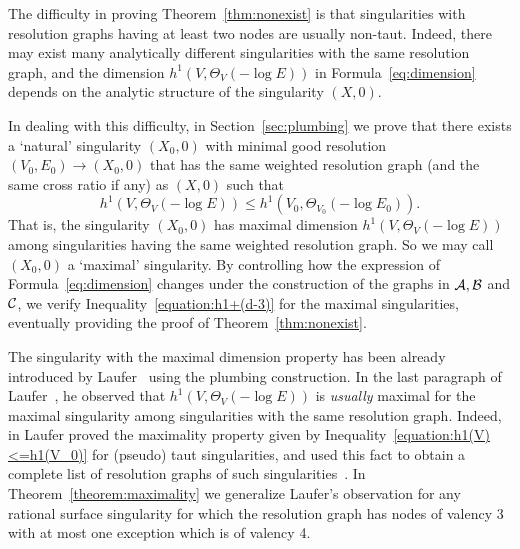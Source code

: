 \documentclass[a4paper, reqno, twoside]{amsart}
\theoremstyle{definition}
\numberwithin{equation}{section}
\begin{document}
The difficulty in proving Theorem~\ref{thm:nonexist} is that singularities
with resolution graphs having at least two nodes are usually non-taut. Indeed,
there may exist many a\-na\-ly\-ti\-cal\-ly different singularities with the
same resolution graph, and the dimension $h^1(V, \Theta_V(-\log{E}))$ in
Formula~\eqref{eq:dimension} depends on the analytic structure of the
singularity $(X,0)$.

In dealing with this difficulty, in Section~\ref{sec:plumbing} we
prove that there exists a `natural' singularity $(X_0, 0)$ with
minimal good resolution $(V_0, E_0) \to (X_0,0)$ that has the same
weighted resolution graph (and the same cross ratio if any) as $(X,0)$
such that
\begin{equation}\label{equation:h1(V)<=h1(V_0)}
h^1(V, \Theta_V(-\log{E})) \le h^1(V_0, \Theta_{V_0}(-\log{E_0})).
\end{equation}
That is, the singularity $(X_0, 0)$ has maximal dimension $h^1(V,
\Theta_V(-\log{E}))$ among singularities having the same weighted
resolution graph.  So we may call $(X_0, 0)$ a `maximal'
singularity. By controlling how the expression of
Formula~\eqref{eq:dimension} changes under the construction of the
graphs in ${\ensuremath \mathcal{A}}, {\ensuremath \mathcal{B}}$ and ${\ensuremath \mathcal{C}}$, we verify
Inequality~\eqref{equation:h1+(d-3)} for the maximal singularities,
eventually providing the proof of Theorem~\ref{thm:nonexist}.

The singularity with the maximal dimension property has been already
introduced by Laufer~\cite[Theorem~3.9]{Laufer-1973} using the
plumbing construction. In the last paragraph of
Laufer~\cite[p.~93]{Laufer-1973}, he observed that $h^1(V,
\Theta_V(-\log{E}))$ is \emph{usually} maximal for the maximal
singularity among singularities with the same resolution
graph. Indeed, in \cite[Theorem~3.1]{Laufer-1973-Taut} Laufer proved
the maximality property given by
Inequality~\eqref{equation:h1(V)<=h1(V_0)} for (pseudo) taut
singularities, and used this fact to obtain a complete list of
resolution graphs of such singularities~\cite{Laufer-1973-Taut}. In
Theorem~\ref{theorem:maximality} we generalize Laufer's observation
for any rational surface singularity for which the resolution graph
has nodes of valency 3 with at most one exception which is of valency
4.
\end{document}
